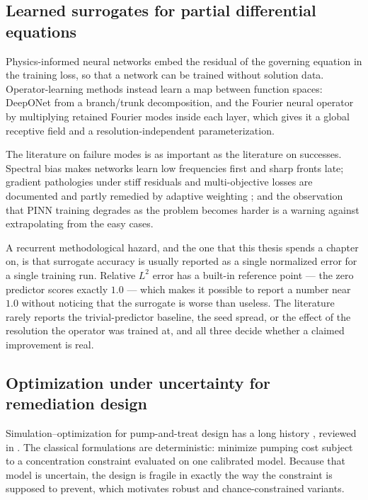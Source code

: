 \documentclass[11pt]{article}
\begin{document}
\subsection{Learned surrogates for partial differential equations}

Physics-informed neural networks \citep{raissi2019pinn,karniadakis2021piml}
embed the residual of the governing equation in the training loss, so that a
network can be trained without solution data. Operator-learning methods instead
learn a map between function spaces: DeepONet \citep{lu2021deeponet} from a
branch/trunk decomposition, and the Fourier neural operator
\citep{li2020fourier,li2021fno,kovachki2023neural} by multiplying retained Fourier
modes inside each layer, which gives it a global receptive field and a
resolution-independent parameterization.

The literature on failure modes is as important as the literature on successes.
Spectral bias makes networks learn low frequencies first and sharp fronts late;
gradient pathologies under stiff residuals and multi-objective losses are
documented and partly remedied by adaptive weighting
\citep{wang2021gradient,jagtap2020xpinn}; and the observation that PINN training
degrades as the problem becomes harder \citep{krishnapriyan2021failure} is a
warning against extrapolating from the easy cases.

A recurrent methodological hazard, and the one that this thesis spends a chapter
on, is that surrogate accuracy is usually reported as a single normalized error
for a single training run. Relative $L^2$ error has a built-in reference point ---
the zero predictor scores exactly $1.0$ --- which makes it possible to report a
number near $1.0$ without noticing that the surrogate is worse than useless. The
literature rarely reports the trivial-predictor baseline, the seed spread, or the
effect of the resolution the operator was trained at, and all three decide whether
a claimed improvement is real.

\subsection{Optimization under uncertainty for remediation design}

Simulation--optimization for pump-and-treat design has a long history
\citep{gorelick1983,wagner1995,mayer2002,ahlfeld2000}, reviewed in
\citep{zheng2002applied}. The classical formulations are deterministic: minimize
pumping cost subject to a concentration constraint evaluated on one calibrated
model. Because that model is uncertain, the design is fragile in exactly the way
the constraint is supposed to prevent, which motivates robust and
chance-constrained variants.
\end{document}
